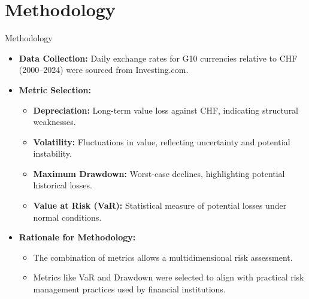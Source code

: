 \documentclass{beamer}
\begin{document}
\section{Methodology}
\begin{frame}{Methodology}
  \begin{itemize}
    \item \textbf{Data Collection:} Daily exchange rates for G10 currencies relative to CHF (2000--2024) were sourced from Investing.com. 
    \item \textbf{Metric Selection:}
    \begin{itemize}
     \item \textbf{Depreciation:} Long-term value loss against CHF, indicating structural weaknesses.
      \item \textbf{Volatility:} Fluctuations in value, reflecting uncertainty and potential instability.
      \item \textbf{Maximum Drawdown:} Worst-case declines, highlighting potential historical losses.
      \item \textbf{Value at Risk (VaR):} Statistical measure of potential losses under normal conditions.
    \end{itemize}
    \item \textbf{Rationale for Methodology:}
    \begin{itemize}
      \item The combination of metrics allows a multidimensional risk assessment.
      \item Metrics like VaR and Drawdown were selected to align with practical risk management practices used by financial institutions.
    \end{itemize}
  \end{itemize}
\end{frame}

\end{document}
